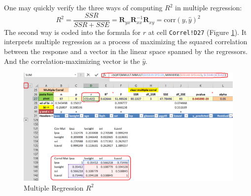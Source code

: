 \documentclass[article]{jss}
\begin{document}
        One may quickly verify the three ways of computing $R^2$ in multiple regression:
        \[{R^2} = \frac{{SSR}}{{SSR + SSE}} = {\textbf{R}_{yx}}\textbf{R}_{xx}^{ - 1}{\textbf{R}_{xy}} = \textrm{corr}{\left( {y,\hat y} \right)^2}\]
        The second way is coded into the formula for $r$ at cell \texttt{Correl!D27} (Figure \ref{fig:Correl_multipleRegression_Rsquare}). It interprets multiple regression as a process of maximizing the squared correlation between the response and a vector in the linear space spanned by the regressors. And the correlation-maximizing vector is the $\hat y$.
        \begin{figure}[!tbh]
            \includegraphics[width=\linewidth, keepaspectratio=true]{Correl_multipleRegression_Rsquare_png}
            \centering{}\protect\caption{Multiple Regression $R ^2$}\label{fig:Correl_multipleRegression_Rsquare}
        \end{figure}
        
\end{document}
